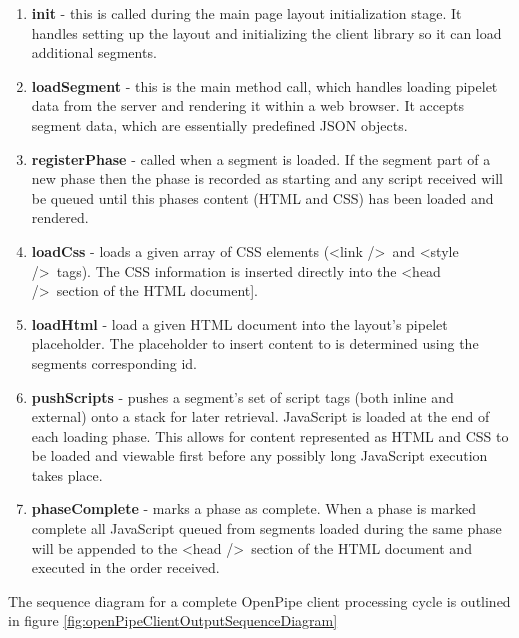 \documentclass[12pt]{report}
\begin{document}
\begin{enumerate}
\item \textbf{init} - this is called during the main page layout initialization stage. It handles setting up the layout and initializing the client library so it can load additional segments.
\item \textbf{loadSegment} - this is the main method call, which handles loading pipelet data from the server and rendering it within a web browser. It accepts segment data, which are essentially predefined JSON objects.
\item \textbf{registerPhase} - called when a segment is loaded. If the segment part of  a new phase then the phase is recorded as starting and any script received will be queued until this phases content (HTML and CSS) has been loaded and rendered.
\item \textbf{loadCss} - loads a given array of CSS elements (\textless link /\textgreater\ and \textless style /\textgreater\ tags). The CSS information is inserted directly into the \textless head /\textgreater\ section of the HTML document].
\item \textbf{loadHtml} - load a given HTML document into the layout’s pipelet placeholder. The placeholder to insert content to is determined using the segments corresponding id.
\item \textbf{pushScripts} - pushes a segment's set of script tags (both inline and external) onto a stack for later retrieval. JavaScript is loaded at the end of each loading phase. This allows for content represented as HTML and CSS to be loaded and viewable first before any possibly long JavaScript execution takes place.
\item \textbf{phaseComplete} - marks a phase as complete. When a phase is marked complete all JavaScript queued from segments loaded during the same phase will be appended to the \textless head /\textgreater\ section of the HTML document and executed in the order received.
\end{enumerate}

The sequence diagram for a complete OpenPipe client processing cycle is outlined in figure \ref{fig:openPipeClientOutputSequenceDiagram}
\end{document}
